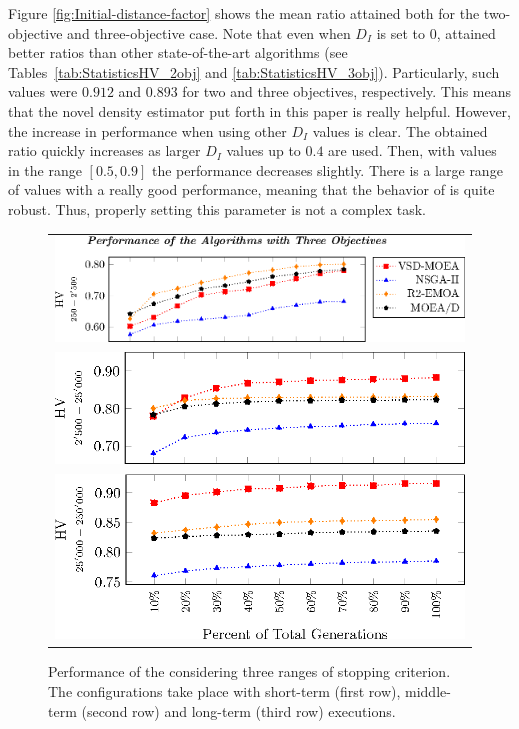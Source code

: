 Figure \ref{fig:Initial-distance-factor} shows the mean \HV{} ratio attained both for the two-objective and three-objective case.
%
Note that even when $D_I$ is set to $0$, \VSDMOEA{} attained better \HV{} ratios than other state-of-the-art algorithms (see Tables~\ref{tab:StatisticsHV_2obj} and \ref{tab:StatisticsHV_3obj}).
%
Particularly, such values were $0.912$ and $0.893$ for two and three objectives, respectively.
%
This means that the novel density estimator put forth in this paper is really helpful.
%
However, the increase in performance when using other $D_I$ values is clear.
%
The obtained \HV{} ratio quickly increases as larger $D_I$ values up to $0.4$ are used.
%
Then, with values in the range $[0.5, 0.9]$ the performance decreases slightly.
%
There is a large range of values with a really good performance, meaning that 
the behavior of \VSDMOEA{} is quite robust.
%
Thus, properly setting this parameter is not a complex task.
%
\begin{figure}[t]
\centering
%
\begin{tabular}{l}
 \includegraphics[scale=0.6]{Images/Time_tikz-figure3.eps}\\[0cm]%
 \includegraphics[scale=0.6]{Images/Time_tikz-figure4.eps}\\[0cm]%
 \includegraphics[scale=0.6]{Images/Time_tikz-figure5.eps}
\end{tabular}
\caption{Performance of the \MOEAS{} considering three ranges of stopping criterion. The configurations take place with short-term (first row), middle-term (second row) and long-term (third row) executions.}\label{fig:Performance_time_3obj}
\end{figure}

